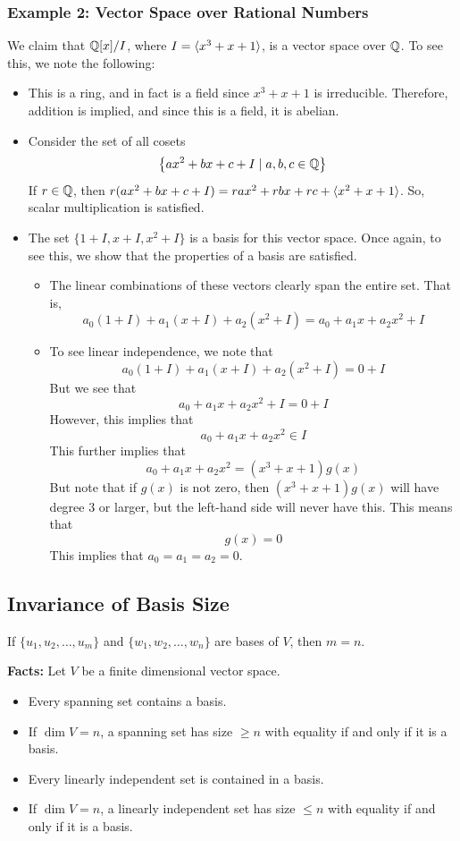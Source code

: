 \documentclass[letterpaper]{article}
\begin{document}
\subsubsection{Example 2: Vector Space over Rational Numbers}
We claim that $\mathbb{Q}[x] / I$, where $I = \langle x^3 + x + 1 \rangle$, is a vector space over $\mathbb{Q}$. To see this, we note the following: 
\begin{itemize}
    \item This is a ring, and in fact is a field since $x^3 + x + 1$ is irreducible. Therefore, addition is implied, and since this is a field, it is abelian. 
    \item Consider the set of all cosets 
    \[\left\{ax^2 + bx + c + I \mid a, b, c \in \mathbb{Q}\right\}\]
    If $r \in \mathbb{Q}$, then $r(ax^2 + bx + c + I) = rax^2 + rbx + rc + \langle x^2 + x + 1 \rangle$. So, scalar multiplication is satisfied. 
    \item The set $\{1 + I, x + I, x^2 + I\}$ is a basis for this vector space. Once again, to see this, we show that the properties of a basis are satisfied. 
    \begin{itemize}
        \item The linear combinations of these vectors clearly span the entire set. That is, 
        \[a_0 (1 + I) + a_1 (x + I) + a_2 (x^2 + I) = a_0 + a_1 x + a_2 x^2 + I\]

        \item To see linear independence, we note that 
        \[a_0 (1 + I) + a_1 (x + I) + a_2 (x^2 + I) = 0 + I\]
        But we see that
        \[a_0 + a_1 x + a_2 x^2 + I = 0 + I\]
        However, this implies that 
        \[a_0 + a_1 x + a_2 x^2 \in I\]
        This further implies that 
        \[a_0 + a_1 x + a_2 x^2 = (x^3 + x + 1) g(x)\]
        But note that if $g(x)$ is not zero, then $(x^3 + x + 1) g(x)$ will have degree 3 or larger, but the left-hand side will never have this. This means that  
        \[g(x) = 0\]
        This implies that $a_0 = a_1 = a_2 = 0$.
    \end{itemize}
\end{itemize}

\subsection{Invariance of Basis Size}
\begin{theorem}{}{}
    If $\{u_1, u_2, \dots, u_m\}$ and $\{w_1, w_2, \dots, w_n\}$ are bases of $V$, then $m = n$.
\end{theorem}
\textbf{Facts:} Let $V$ be a finite dimensional vector space.
\begin{itemize}
    \item Every spanning set contains a basis. 
    \item If $\dim V = n$, a spanning set has size $\geq n$ with equality if and only if it is a basis. 
    \item Every linearly independent set is contained in a basis. 
    \item If $\dim V = n$, a linearly independent set has size $\leq n$ with equality if and only if it is a basis. 
\end{itemize}
\end{document}
